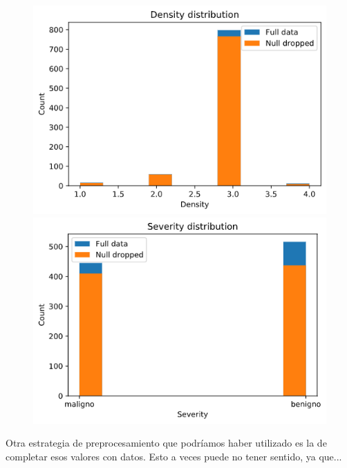 \documentclass[11pt,a4paper]{article}
\begin{document}
    
\begin{figure}[H]
    \centering
    
    \begin{minipage}{0.5\textwidth}
        \centering
        \includegraphics[scale=0.35]{img/density-distribution.png}
    \end{minipage}%
    \begin{minipage}{0.5\textwidth}
        \centering
        \includegraphics[scale=0.35]{img/severity-distribution.png}
    \end{minipage}
    
\end{figure}
    
Otra estrategia de preprocesamiento que podríamos haber utilizado es la de completar esos valores con datos. Esto a veces puede
no tener sentido, ya que...
    
\end{document}
